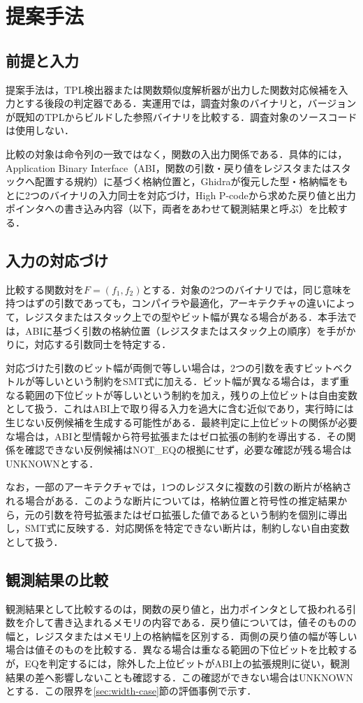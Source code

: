\section{提案手法}

\subsection{前提と入力}
提案手法は，TPL検出器または関数類似度解析器が出力した関数対応候補を入力とする後段の判定器である．実運用では，調査対象のバイナリと，バージョンが既知のTPLからビルドした参照バイナリを比較する．調査対象のソースコードは使用しない．

比較の対象は命令列の一致ではなく，関数の入出力関係である．具体的には，Application Binary Interface（ABI，関数の引数・戻り値をレジスタまたはスタックへ配置する規約）に基づく格納位置と，Ghidraが復元した型・格納幅をもとに2つのバイナリの入力同士を対応づけ，High P-codeから求めた戻り値と出力ポインタへの書き込み内容（以下，両者をあわせて観測結果と呼ぶ）を比較する．

\subsection{入力の対応づけ}\label{sec:input-corr}
比較する関数対を$F=(f_1,f_2)$とする．対象の2つのバイナリでは，同じ意味を持つはずの引数であっても，コンパイラや最適化，アーキテクチャの違いによって，レジスタまたはスタック上での型やビット幅が異なる場合がある．本手法では，ABIに基づく引数の格納位置（レジスタまたはスタック上の順序）を手がかりに，対応する引数同士を特定する．

対応づけた引数のビット幅が両側で等しい場合は，2つの引数を表すビットベクトルが等しいという制約をSMT式に加える．ビット幅が異なる場合は，まず重なる範囲の下位ビットが等しいという制約を加え，残りの上位ビットは自由変数として扱う．これはABI上で取り得る入力を過大に含む近似であり，実行時には生じない反例候補を生成する可能性がある．最終判定に上位ビットの関係が必要な場合は，ABIと型情報から符号拡張またはゼロ拡張の制約を導出する．その関係を確認できない反例候補はNOT\_EQの根拠にせず，必要な確認が残る場合はUNKNOWNとする．

なお，一部のアーキテクチャでは，1つのレジスタに複数の引数の断片が格納される場合がある．このような断片については，格納位置と符号性の推定結果から，元の引数を符号拡張またはゼロ拡張した値であるという制約を個別に導出し，SMT式に反映する．対応関係を特定できない断片は，制約しない自由変数として扱う．

\subsection{観測結果の比較}
観測結果として比較するのは，関数の戻り値と，出力ポインタとして扱われる引数を介して書き込まれるメモリの内容である．戻り値については，値そのものの幅と，レジスタまたはメモリ上の格納幅を区別する．両側の戻り値の幅が等しい場合は値そのものを比較する．異なる場合は重なる範囲の下位ビットを比較するが，EQを判定するには，除外した上位ビットがABI上の拡張規則に従い，観測結果の差へ影響しないことも確認する．この確認ができない場合はUNKNOWNとする．この限界を\ref{sec:width-case}節の評価事例で示す．

